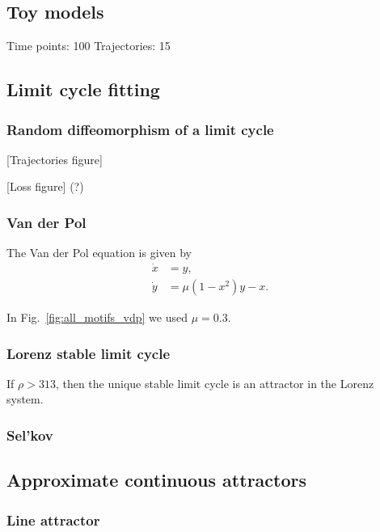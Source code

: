 \documentclass{article}
\theoremstyle{definition} \newtheorem{definition}{Definition}  \newtheorem{example}{Example}
\theoremstyle{remark} \newtheorem{remark}{Remark}
\newcounter{ct}
\begin{document}
 \subsection{Toy models}
 Time points: 100
 Trajectories: 15

\subsection{Limit cycle fitting}

\subsubsection{Random diffeomorphism of a limit cycle}

[Trajectories figure]

[Loss figure] (?)



\subsubsection{Van der Pol}
The Van der Pol equation is given by 
\begin{equation}
\begin{aligned}
\dot{x} &= y, \\
\dot{y} &= \mu (1 - x^2) y - x.
\end{aligned}
\end{equation}

In Fig.~\ref{fig:all_motifs_vdp} we used $\mu=0.3$.


\subsubsection{Lorenz stable limit cycle}
\citep{lorenz1963deterministic}
If $\rho>313$, then the unique stable limit cycle is an attractor in the Lorenz system\citep{gaiko2014global}.


\subsubsection{Sel'kov}
\citep{selkov1968self}




\subsection{Approximate continuous attractors}
\subsubsection{Line attractor}
\end{document}
